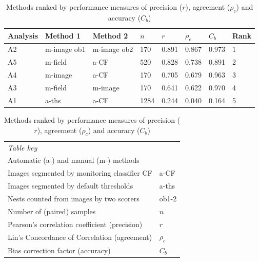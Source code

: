 \begin{table}[!htbp]\myfloatalign
\caption[Methods ranked by performance measures.]{Methods ranked by performance measures of precision ($r$), agreement ($\rho_{c}$) and accuracy ($C_{b}$)}\label{tab:ranked}
\begin{tabular}{p{0.5in}p{0.65in}p{0.65in}p{0.3in}p{0.3in}p{0.3in}p{0.3in}l} \toprule
Analysis & Method 1 & Method 2 & $ n $ & $r$ & $\rho_{c}$ & $C_{b}$ & Rank \\ \midrule
A2 & m-image ob1 & m-image ob2 & 170 & 0.891 & 0.867 & 0.973 & 1\\
A5 & m-field & a-CF & 520 &  0.828  & 0.738 & 0.891 & 2\\ 
A4 & m-image & a-CF & 170 & 0.705  &  0.679 & 0.963 & 3\\
A3 & m-field & m-image & 170 & 0.641 & 0.622 & 0.970 & 4\\
A1 & a-ths & a-CF & 1284 & 0.244 & 0.040 & 0.164 & 5\\ \bottomrule
\end{tabular} 
\begin{tabular}{p{3.6in}l} \\
\emph{Table key} & \\ 
Automatic (a-) and manual (m-) methods &\\
Images segmented by monitoring classifier CF  &  a-CF \\
Images segmented by default thresholds & a-ths\\
Nests counted from images by two scorers  & ob1-2 \\
Number of (paired) samples &  $ n $\\
Pearson's correlation coefficient (precision)&  $r$ \\
Lin's Concordance of Correlation (agreement) &  $ \rho_c $ \\
Bias correction factor (accuracy) & $ C_{b} $ \\
\end{tabular}
\end{table}

